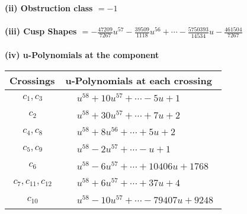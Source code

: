 \documentclass[1p]{elsarticle_modified}
\theoremstyle{definition}
\begin{document}
\flushleft \textbf{(ii) Obstruction class $= -1$}\\~\\
\flushleft \textbf{(iii) Cusp Shapes $= -\frac{47209}{7267} u^{57}-\frac{39509}{1118} u^{56}+\cdots-\frac{5750393}{14534} u-\frac{461504}{7267}$}\\~\\
\newpage\renewcommand{\arraystretch}{1}
\flushleft \textbf{(iv) u-Polynomials at the component}\newline \\
\begin{tabular}{m{50pt}|m{274pt}}
Crossings & \hspace{64pt}u-Polynomials at each crossing \\
\hline $$\begin{aligned}c_{1},c_{3}\end{aligned}$$&$\begin{aligned}
&u^{58}+10 u^{57}+\cdots-5 u+1
\end{aligned}$\\
\hline $$\begin{aligned}c_{2}\end{aligned}$$&$\begin{aligned}
&u^{58}+30 u^{57}+\cdots+7 u+2
\end{aligned}$\\
\hline $$\begin{aligned}c_{4},c_{8}\end{aligned}$$&$\begin{aligned}
&u^{58}+8 u^{56}+\cdots+5 u+2
\end{aligned}$\\
\hline $$\begin{aligned}c_{5},c_{9}\end{aligned}$$&$\begin{aligned}
&u^{58}-2 u^{57}+\cdots- u+1
\end{aligned}$\\
\hline $$\begin{aligned}c_{6}\end{aligned}$$&$\begin{aligned}
&u^{58}-6 u^{57}+\cdots+10406 u+1768
\end{aligned}$\\
\hline $$\begin{aligned}c_{7},c_{11},c_{12}\end{aligned}$$&$\begin{aligned}
&u^{58}+6 u^{57}+\cdots+37 u+4
\end{aligned}$\\
\hline $$\begin{aligned}c_{10}\end{aligned}$$&$\begin{aligned}
&u^{58}-10 u^{57}+\cdots-79407 u+9248
\end{aligned}$\\
\hline
\end{tabular}\\~\\
\end{document}
